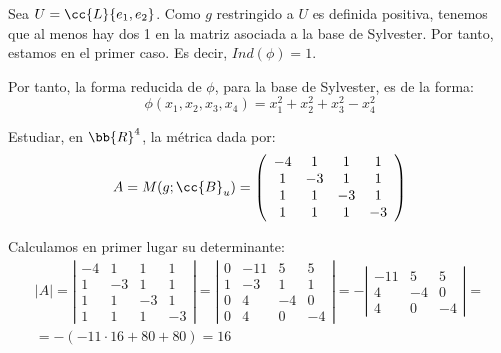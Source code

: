 \begin{ejercicio}
    Sea $U=\cc{L}\{e_1, e_2\}$. Como $g$ restringido a $U$ es definida positiva, tenemos que al menos hay dos 1 en la matriz asociada a la base de Sylvester. Por tanto, estamos en el primer caso. Es decir, $Ind(\phi)=1$.

    Por tanto, la forma reducida de $\phi$, para la base de Sylvester, es de la forma:
    \begin{equation*}
        \phi(x_1, x_2, x_3, x_4) = x_1^2 + x_2^2 + x_3^2 - x_4^2
    \end{equation*}
\end{ejercicio}


\begin{ejercicio}
    Estudiar, en $\bb{R}^4$, la métrica dada por:
    \begin{equation*}
        A = M(g; \cc{B}_u) = \left( \begin{array}{cccc}
            -4 & 1 & 1 & 1 \\
            1 & -3 & 1 & 1 \\
            1 & 1 & -3 & 1 \\
            1 & 1 & 1 & -3
        \end{array}\right)
    \end{equation*}

    Calculamos en primer lugar su determinante:
    \begin{multline*}
        |A| = \left| \begin{array}{cccc}
            -4 & 1 & 1 & 1 \\
            1 & -3 & 1 & 1 \\
            1 & 1 & -3 & 1 \\
            1 & 1 & 1 & -3
        \end{array}\right|
        = \left| \begin{array}{cccc}
            0 & -11 & 5 & 5 \\
            1 & -3 & 1 & 1 \\
            0 & 4 & -4 & 0 \\
            0 & 4 & 0 & -4
        \end{array}\right|
        = -\left| \begin{array}{ccc}
            -11 & 5 & 5 \\
            4 & -4 & 0 \\
            4 & 0 & -4
        \end{array}\right| =\\= -(-11\cdot 16 +80+80) = 16
    \end{multline*}


\end{ejercicio}
